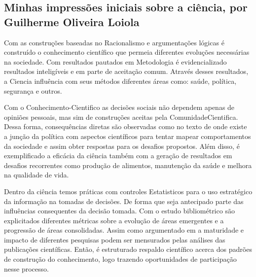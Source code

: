 \subsection{Minhas impressões iniciais sobre a ciência, por Guilherme Oliveira Loiola}

Com as construções baseadas no \gls{Racionalismo} e argumentações lógicas é construído o conhecimento científico que permeia diferentes evoluções necessárias na sociedade. Com resultados pautados em \gls{Metodologia} é evidencializado resultados inteligíveis e em parte de aceitação comum. Através desses resultados, a \gls{Ciencia} influência com seus métodos diferentes áreas como: saúde, política, segurança e outros. 

Com o \gls{Conhecimento-Cientifico} as decisões sociais não dependem apenas de opiniões pessoais, mas sim de construções aceitas pela \gls{ComunidadeCientifica}. Dessa forma, consequências diretas são observadas como no texto de \citet{frickel_new_2006} onde existe a junção da política com aspectos científicos para tentar mapear comportamentos da sociedade e assim obter respostas para os desafios propostos. Além disso, é exemplificado a eficácia da ciência também com a geração de resultados em desafios recorrentes como produção de alimentos, manutenção da saúde e melhora na qualidade de vida.  

Dentro da ciência temos práticas com controles \gls{Estatisticos} para o uso estratégico da informação na tomadas de decisões. De forma que seja antecipado parte das influências consequentes da decisão tomada. Com o estudo bibliométrico são explicitados diferentes métricas sobre a evolução de áreas emergentes e a progressão de áreas consolidadas. Assim como argumentado em \citet{santa_soriano_bibliometric_2018} a maturidade e impacto de diferentes pesquisas podem ser mensurados pelas análises das publicações científicas. Então, é estruturado respaldo científico acerca dos padrões de construção do conhecimento, logo trazendo oportunidades de participação nesse processo.

